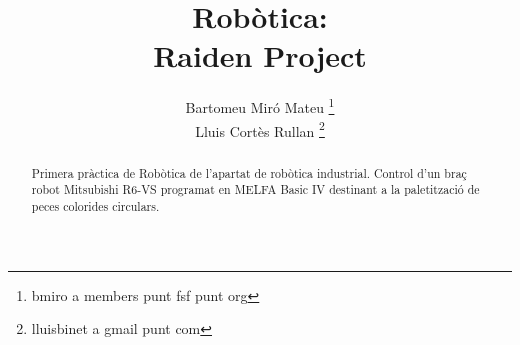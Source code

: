 \documentclass[a4paper,11pt]{scrartcl}
\title{Robòtica: \\ Raiden Project}
\author{ Bartomeu Miró Mateu \thanks{bmiro a members punt fsf punt org} \\
	 Lluis Cortès Rullan \thanks{lluisbinet a gmail punt com} }
\begin{document}
  \maketitle

  \begin{abstract}
    Primera pràctica de Robòtica de l'apartat de robòtica industrial.
    Control d'un braç robot Mitsubishi R6-VS programat en MELFA Basic IV
    destinant a la paletització de peces colorides circulars.
  \end{abstract}

  \newpage
  \setcounter{page}{2}
  \tableofcontents
  \newpage

  
  
  
  
  
\end{document}
